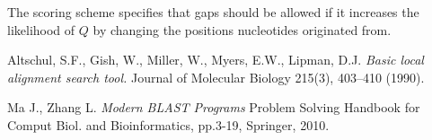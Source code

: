 \documentclass[11pt]{IEEEtran}
\begin{document}
The scoring scheme specifies that gaps should be allowed if it increases the likelihood of $Q$ by changing the positions nucleotides originated from.

\begin{thebibliography}{9}

Altschul, S.F., Gish, W., Miller, W., Myers, E.W., Lipman, D.J. 
\emph{Basic local alignment search tool. }
Journal of Molecular Biology 215(3), 403–410 (1990).

Ma J., Zhang L.
\emph{Modern BLAST Programs}
Problem Solving Handbook for Comput Biol. and Bioinformatics, pp.3-19, Springer, 2010.


\end{thebibliography}
\end{document}
